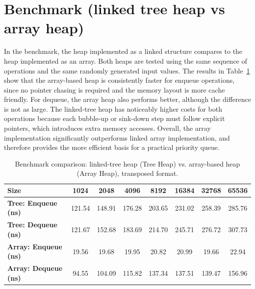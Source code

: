 \documentclass[a4paper,11pt]{article}
\begin{document}
\section*{Benchmark (linked tree heap vs array heap)}
In the benchmark, the heap implemented as a linked structure compares to the heap implemented as an array. Both heaps are tested using the same sequence of operations and the same randomly generated input values. The results in Table~\ref{tab:tree-array-transposed} show that the array-based heap is consistently faster for enqueue operations, since no pointer chasing is required and the memory layout is more cache friendly. For dequeue, the array heap also performs better, although the difference is not as large. The linked-tree heap has noticeably higher costs for both operations because each bubble-up or sink-down step must follow explicit pointers, which introduces extra memory accesses. Overall, the array implementation significantly outperforms linked array implementation, and therefore provides the more efficient basis for a practical priority queue.

\begin{table}[h]
\centering
\begin{tabular}{l|ccccccc}
\textbf{Size}
    & 1024 & 2048 & 4096 & 8192 & 16384 & 32768 & 65536 \\
\hline
\textbf{Tree: Enqueue (ns)}
    & 121.54 & 148.91 & 176.28 & 203.65 & 231.02 & 258.39 & 285.76 \\
\textbf{Tree: Dequeue (ns)}
    & 121.67 & 152.68 & 183.69 & 214.70 & 245.71 & 276.72 & 307.73 \\
\hline
\textbf{Array: Enqueue (ns)}
    & 19.56 & 19.68 & 19.95 & 20.82 & 20.99 & 19.66 & 22.94 \\
\textbf{Array: Dequeue (ns)}
    & 94.55 & 104.09 & 115.82 & 137.34 & 137.51 & 139.47 & 156.96 \\
\end{tabular}
\caption{Benchmark comparison: linked-tree heap (Tree Heap) vs. array-based heap (Array Heap), transposed format.}
\label{tab:tree-array-transposed}
\end{table}
\end{document}
